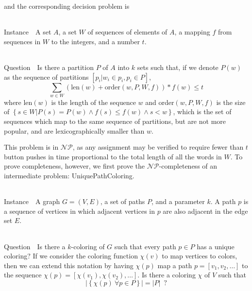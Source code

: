 \documentclass[runningheads]{llncs}
\newcommand{\NP}{\ensuremath{\mathcal{NP}}}
\newcommand{\Instance}{{\sc Instance~}}
\newcommand{\Question}{~\\
{\sc Question~}}
\begin{document}
and the corresponding decision problem is

\begin{prob}~\\
\label{minstrokesdecision}
\Instance\ A set $A$, a set $W$ of sequences of elements of $A$, a mapping $f$ from sequences in $W$ to the integers, and a number $t$.

\Question\ Is there a partition $P$ of $A$ into $k$ sets such that, if we denote $P(w)$ as the sequence of partitions $[p_i | w_i \in p_i, p_i \in P]$,
$$\sum_{w\in W} (\mathrm{len}(w)+\mathrm{order}(w,P,W,f)) * f(w) \le t$$
where len$(w)$ is the length of the sequence $w$ and order$(w,P,W,f)$ is the size of $\left\{s\in W | P(s) = P(w) \land f(s) \le f(w) \land s < w \right\}$, which is the set of sequences which map to the same sequence of partitions, but are not more popular, and are lexicographically smaller than $w$.
\end{prob}

This problem is in \NP, as any assignment may be verified to require
fewer than $t$ button pushes in time proportional to the total length of all
the words in $W$.  To prove completeness, however, we first prove the
\NP-completeness of an intermediate problem: {\sc UniquePathColoring}.

\begin{prob}[{\sc UniquePathColoring}]~\\
\label{upcolor}
\Instance\ A graph $G=(V,E)$, a set of paths $P$, and a parameter $k$.  A path
$p$ is a sequence of vertices in which adjacent vertices in $p$ are also
adjacent in the edge set $E$.

\Question\ Is there a $k$-coloring of $G$ such that every path $p\in P$ has a
unique coloring?  If we consider the coloring function $\chi(v)$ to map
vertices to colors, then we can extend this notation by having $\chi(p)$ map a
path $p = [ v_1, v_2, \ldots ]$ to the sequence $\chi(p) = [ \chi(v_1),
\chi(v_2), \ldots ]$.  Is there a coloring $\chi$ of $V$ such that 
    $$|\left\{ \chi(p)~\forall p \in P\right\}| = |P|\enspace ?$$
\end{prob}
\end{document}
